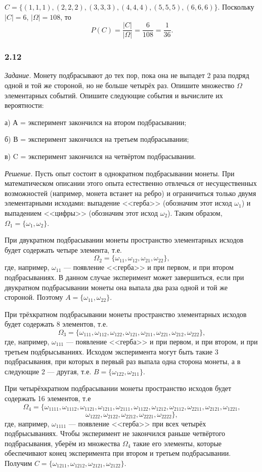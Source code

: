 \documentclass{book}
\begin{document}
$C=\{(1, 1, 1), (2, 2, 2), (3, 3, 3), (4, 4, 4), (5, 5, 5), (6, 6, 6)\}$. Поскольку $|C|=6$, $|\Omega|=108$, то $$P(C)=\frac{|C|}{|\Omega|}=\frac{6}{108}=\frac{1}{36}.$$

\subsubsection*{2.12}

\textit{Задание.} Монету подбрасывают до тех пор, пока она не выпадет 2 раза подряд одной и той же стороной, но не больше четырёх раз. Опишите множество $\Omega$ элементарных событий. Опишите следующие события и вычислите их вероятности:

а) А = { эксперимент закончился на втором подбрасывании};

б) В = { эксперимент закончился на третьем подбрасывании};

в) C = { эксперимент закончился на четвёртом подбрасывании}.

\textit{Решение.}  Пусть опыт состоит в однократном подбрасывании монеты. При математическом описании этого опыта естественно отвлечься от несущественных возможностей (например, монета встанет на ребро) и ограничиться только двумя элементарными исходами: выпадение <<герба>> (обозначим этот исход $\omega_1$) и выпадением <<цифры>> (обозначим этот исход $\omega_2$). Таким образом, $\Omega_1=\{\omega_1, \omega_2\}$.

При двукратном подбрасывании монеты пространство элементарных исходов будет содержать четыре элемента, т.е. $$\Omega_2=\{\omega_{11}, \omega_{12}, \omega_{21}, \omega_{22}\},$$ где, например, $\omega_{11}$ --- появление <<герба>> и при первом, и при втором подбрасываниях. В данном случае эксперимент может завершиться, если при двукратном подбрасывании монеты она выпала два раза одной и той же стороной. Поэтому $A=\{\omega_{11}, \omega_{22}\}$.

При трёхкратном подбрасывании монеты пространство элементарных исходов будет содержать 8 элементов, т.е. $$\Omega_3=\{\omega_{111}, \omega_{112}, \omega_{122}, \omega_{121}, \omega_{211}, \omega_{221}, \omega_{212}, \omega_{222}\},$$ где, например, $\omega_{111}$ --- появление <<герба>> и при первом, и при втором, и при третьем подбрысываниях. Исходом эксперимента могут быть такие 3 подбрасывания, при которых в первый раз выпала одна сторона монеты, а в следующие 2 --- другая, т.е. $B=\{\omega_{122}, \omega_{211}\}$.

При четырёхкратном подбрасывании монеты пространство исходов будет содержать 16 элементов, т.е $$\Omega_4=\{\omega_{1111}, \omega_{1112}, \omega_{1121}, \omega_{1211}, \omega_{2111}, \omega_{1122}, \omega_{1212}, \omega_{2112}, \omega_{2211}, \omega_{2121}, \omega_{1221},$$$$\omega_{1222}, \omega_{2122}, \omega_{2212}, \omega_{2221}, \omega_{2222}\},$$ где, например, $\omega_{1111}$ --- появление <<герба>> при всех четырёх подбрысываниях. Чтобы эксперимент не закончился раньше четвёртого подбрасывания, уберём из множества $\Omega_4$ такие его элементы, которые обеспечивают конец эксперимента при втором и третьем подбрасывании. Получим $C=\{\omega_{1211}, \omega_{1212}, \omega_{2121}, \omega_{2122}\}$.
\end{document}

